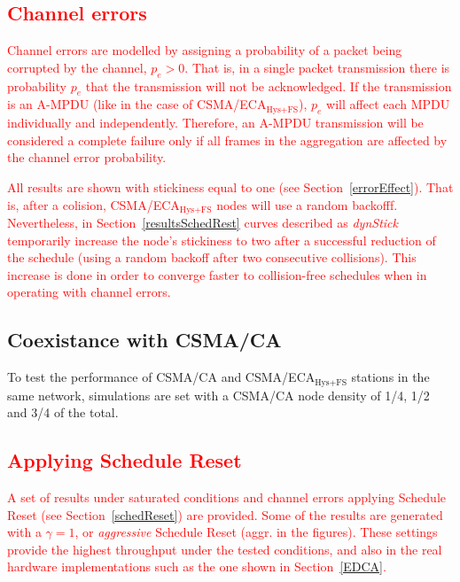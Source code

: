 	\textcolor{red}{\subsection{Channel errors}\label{channelErrorsDef}
	Channel errors are modelled by assigning a probability of a packet being corrupted by the channel, $p_e>0$. That is, in a single packet transmission there is probability $p_e$ that the transmission will not be acknowledged. If the transmission is an A-MPDU (like in the case of CSMA/ECA$_{\text{Hys+FS}}$), $p_e$ will affect each MPDU individually and independently. Therefore, an A-MPDU transmission will be considered a complete failure only if all frames in the aggregation are affected by the channel error probability.}
	
	\textcolor{red}{All results are shown with stickiness equal to one (see Section~\ref{errorEffect}). That is, after a colision, CSMA/ECA$_{\text{Hys+FS}}$ nodes will use a random backofff. Nevertheless, in Section~\ref{resultsSchedRest} curves described as \emph{dynStick} temporarily increase the node's stickiness to two after a successful reduction of the schedule (using a random backoff after two consecutive collisions). This increase is done in order to converge faster to collision-free schedules when in operating with channel errors.}
	
	\subsection{Coexistance with CSMA/CA}\label{coexistence}
	To test the performance of CSMA/CA and CSMA/ECA$_{\text{Hys+FS}}$ stations in the same network, simulations are set with a CSMA/CA node density of 1/4, 1/2 and 3/4 of the total.
	
	\textcolor{red}{\subsection{Applying Schedule Reset} 
	A set of results under saturated conditions and channel errors applying Schedule Reset (see Section~\ref{schedReset}) are provided. Some of the results are generated with a $\gamma=1$, or \emph{aggressive} Schedule Reset (aggr. in the figures). These settings provide the highest throughput under the tested conditions, and also in the real hardware implementations such as the one shown in Section~\ref{EDCA}.
	}

